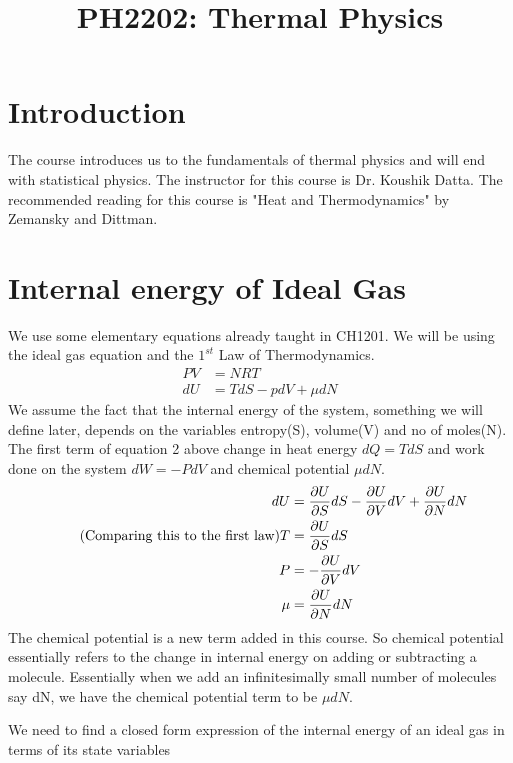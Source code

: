\documentclass[a4paper]{article}
\title{PH2202: Thermal Physics}
\begin{document}
\maketitle
    \newpage
    \tableofcontents
    \newpage 
    \section{Introduction}
    The course introduces us to the fundamentals of thermal physics and will end with statistical
    physics. The instructor for this course is Dr. Koushik Datta. The recommended reading for this
    course is "Heat and Thermodynamics" by Zemansky and Dittman.
    
    \section{Internal energy of Ideal Gas}
    We use some elementary equations already taught in CH1201. We will be using the ideal gas 
    equation and the $1^{st}$ Law of Thermodynamics. 
    \begin{align*}
        PV &= NRT \\ 
        dU &= TdS - pdV + \mu dN
    \end{align*}
    We assume the fact that the internal energy of the system, something we will define later,
    depends on the variables entropy(S), volume(V) and no of moles(N). The first term of equation
    2 above change in heat energy $dQ = TdS$ and work done on the system $dW = -PdV$ and 
    chemical potential $\mu dN$. 
    \begin{align*}
        dU &= \pdv{U}{S}dS - \pdv{U}{V}dV + \pdv{U}{N}dN \\ 
        \tag{Comparing this to the first law} 
        T &= \pdv{U}{S}dS\\ 
        P &= - \pdv{U}{V}dV \\ 
        \mu &= \pdv{U}{N}dN 
    \end{align*}
    The chemical potential is a new term added in this course. %
    So chemical potential essentially refers to the change in internal energy on adding or 
    subtracting a molecule. Essentially when we add an infinitesimally small number of molecules
    say dN, we have the chemical potential term to be $\mu dN$.%
    
    \begin{problem}
      We need to find a closed form expression of the internal energy of an ideal gas in terms 
      of its state variables
    \end{problem}
\end{document}
